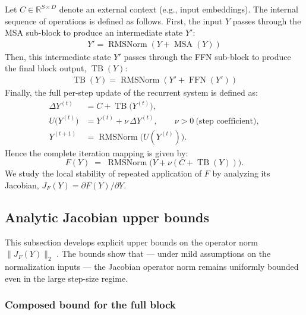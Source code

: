 \documentclass{zapiski}
\theoremstyle{plain}
\theoremstyle{definition}
\theoremstyle{remark}
\begin{document}
Let $C\in\mathbb{R}^{S\times D}$ denote an external context (e.g., input embeddings). The internal sequence of operations is defined as follows.
First, the input $Y$ passes through the MSA sub-block to produce an intermediate state $Y'$:
\begin{align}
    Y' = \operatorname{RMSNorm}(Y + \operatorname{MSA}(Y)) \label{eq:subblock1_final}
\end{align}
Then, this intermediate state $Y'$ passes through the FFN sub-block to produce the final block output, $\operatorname{TB}(Y)$:
\begin{align}
    \operatorname{TB}(Y) = \operatorname{RMSNorm}(Y' + \operatorname{FFN}(Y')) \label{eq:subblock2_final}
\end{align}
Finally, the full per-step update of the recurrent system is defined as:
\begin{align}
    \Delta Y^{(t)} &= C + \operatorname{TB}\big(Y^{(t)}\big), \label{eq:deltaY_final}\\
    U\big(Y^{(t)}\big) &= Y^{(t)} + \nu\,\Delta Y^{(t)},\qquad \nu>0 \ \text{(step coefficient)},\\
    Y^{(t+1)} &= \operatorname{RMSNorm}\big(U(Y^{(t)})\big). \label{eq:update_final}
\end{align}
Hence the complete iteration mapping is given by:
\begin{equation}\label{eq:F_def_final}
    F(Y) \;=\; \operatorname{RMSNorm}\!\big(Y + \nu(C+\operatorname{TB}(Y))\big).
\end{equation}
We study the local stability of repeated application of $F$ by analyzing its Jacobian, $J_F(Y)=\partial F(Y)/\partial Y$.

\subsection{Analytic Jacobian upper bounds}
\label{ssec:analytic}

This subsection develops explicit upper bounds on the operator norm $\|J_F(Y)\|_2$
 . The bounds  show that — under mild assumptions on the normalization inputs — the Jacobian operator norm remains uniformly bounded even in the large step-size regime.



\subsubsection{Composed bound for the full block}
\label{sssec:composed_bound}
\end{document}
